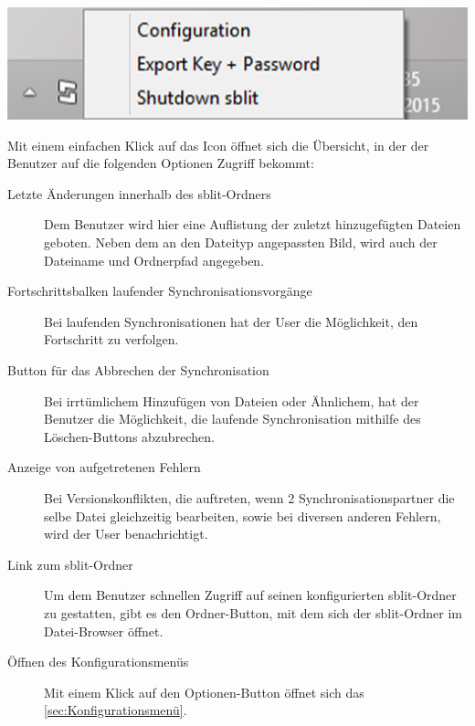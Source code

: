 \includegraphics[]{images/systemtray.png}

Mit einem einfachen Klick auf das Icon öffnet sich die Übersicht, in der der Benutzer auf die folgenden Optionen Zugriff bekommt:

\begin{description}
	
	\item[{Letzte Änderungen innerhalb des sblit-Ordners}]
		Dem Benutzer wird hier eine Auflistung der zuletzt hinzugefügten Dateien geboten. Neben dem an den Dateityp angepassten Bild, wird auch der Dateiname und Ordnerpfad angegeben.

	\item[{Fortschrittsbalken laufender Synchronisationsvorgänge}]
		Bei laufenden Synchronisationen hat der User die Möglichkeit, den Fortschritt zu verfolgen.

	\item[{Button für das Abbrechen der Synchronisation}]
		Bei irrtümlichem Hinzufügen von Dateien oder Ähnlichem, hat der Benutzer die Möglichkeit, die laufende Synchronisation mithilfe des Löschen-Buttons abzubrechen.

	\item[{Anzeige von aufgetretenen Fehlern}]
		Bei Versionskonflikten, die auftreten, wenn 2 Synchronisationspartner die selbe Datei gleichzeitig bearbeiten, sowie bei diversen anderen Fehlern, wird der User benachrichtigt. 

	\item[{Link zum sblit-Ordner}]
		Um dem Benutzer schnellen Zugriff auf seinen konfigurierten sblit-Ordner zu gestatten, gibt es den Ordner-Button, mit dem sich der sblit-Ordner im Datei-Browser öffnet.

	\item[{Öffnen des Konfigurationsmenüs}]
		Mit einem Klick auf den Optionen-Button öffnet sich das \ref{sec:Konfigurationsmenü}.
\end{description}